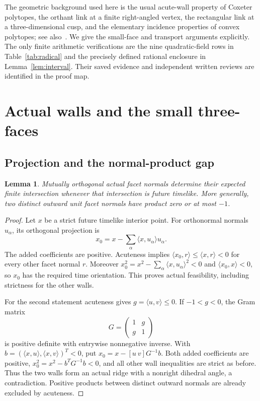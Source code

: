 \documentclass[11pt]{article}
\newtheorem{lemma}[theorem]{Lemma}
\theoremstyle{definition}\newtheorem{definition}[theorem]{Definition}
\theoremstyle{remark}\newtheorem{remark}[theorem]{Remark}
\newcommand{\ip}[2]{\langle #1,#2\rangle}
\begin{document}
The geometric background used here is the usual acute-wall property of
Coxeter polytopes, the orthant link at a finite right-angled vertex,
the rectangular link at a three-dimensional cusp, and the elementary
incidence properties of convex polytopes; see also~\cite{PV}. We give
the small-face and transport arguments explicitly. The only finite
arithmetic verifications are the nine quadratic-field rows in
Table~\ref{tab:radical} and the precisely defined rational enclosure in
Lemma~\ref{lem:interval}. Their saved evidence and independent written
reviews are identified in the proof map.

\section{Actual walls and the small three-faces}
\subsection{Projection and the normal-product gap}
\begin{lemma}\label{lem:projection}
Mutually orthogonal actual facet normals determine their expected
finite intersection whenever that intersection is future timelike.
More generally, two distinct outward unit facet normals have product
zero or at most \(-1\).
\end{lemma}
\begin{proof}
Let \(x\) be a strict future timelike interior point. For orthonormal
normals \(u_\alpha\), its orthogonal projection is
\[
 x_0=x-\sum_\alpha\ip{x}{u_\alpha}u_\alpha.
\]
The added coefficients are positive. Acuteness implies
\(\ip{x_0}{r}\le\ip{x}{r}<0\) for every other facet normal \(r\).
Moreover \(x_0^2=x^2-\sum_\alpha\ip{x}{u_\alpha}^2<0\) and
\(\ip{x_0}{x}<0\), so \(x_0\) has the required time orientation.
This proves actual feasibility, including strictness for the other walls.

For the second statement acuteness gives \(g=\ip{u}{v}\le0\).
If \(-1<g<0\), the Gram matrix
\[
 G=\begin{pmatrix}1&g\\g&1\end{pmatrix}
\]
is positive definite with entrywise nonnegative inverse. With
\(b=(\ip{x}{u},\ip{x}{v})^T<0\), put
\(x_0=x-[u\ v]G^{-1}b\). Both added coefficients are positive,
\(x_0^2=x^2-b^TG^{-1}b<0\), and all other wall inequalities are
strict as before. Thus the two walls form an actual ridge with a
nonright dihedral angle, a contradiction. Positive products between
distinct outward normals are already excluded by acuteness.
\end{proof}
\end{document}
